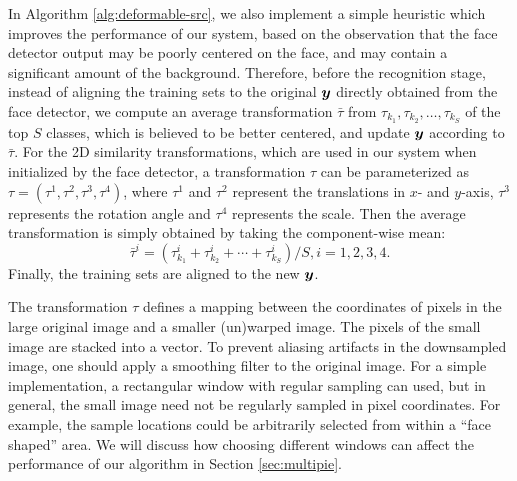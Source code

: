 \documentclass[10pt,journal,letterpaper,compsoc]{IEEEtran}
\begin{document}
In Algorithm \ref{alg:deformable-src}, we also implement a simple heuristic which improves the
performance of our system, based on the observation that the face detector output may be poorly centered on
the face, and may contain a significant amount of the background.  Therefore, before the recognition stage,
instead of aligning the training sets to the
original ${\boldsymbol{y}}$ directly obtained from the face detector, we
compute an average transformation $\bar{\tau}$ from $\tau_{k_1},
\tau_{k_2}, \ldots, \tau_{k_S}$ of the top $S$ classes, which
is believed to be better centered, and update ${\boldsymbol{y}}$ according to
$\bar{\tau}$. For the 2D similarity transformations, which are
used in our system when initialized by the face detector, a
transformation $\tau$ can be parameterized as $\tau = (\tau^1,
\tau^2, \tau^3, \tau^4)$, where $\tau^1$ and $\tau^2$ represent
the translations in $x$- and $y$-axis, $\tau^3$ represents the
rotation angle and $\tau^4$ represents the scale. Then the
average transformation is simply obtained by taking the
component-wise mean:
\begin{displaymath}
\bar{\tau}^i = (\tau_{k_1}^i + \tau_{k_2}^i + \cdots +
\tau_{k_S}^i) / S, i = 1,2,3,4.
\end{displaymath}
Finally, the training sets are aligned to the new ${\boldsymbol{y}}$.



The transformation $\tau$ defines a mapping between the
coordinates of pixels in the large original image and a smaller
(un)warped image. The pixels of the small image are stacked into a vector. To prevent aliasing
artifacts in the downsampled image, one should apply a
smoothing filter to the original image. For a simple implementation, a rectangular window with
regular sampling can used, but in general, the small image need
not be regularly sampled in pixel coordinates.  For example,
the sample locations could be arbitrarily selected from within a
``face shaped'' area. We will discuss how choosing
different windows can affect the performance of our algorithm
in Section \ref{sec:multipie}.
\end{document}

